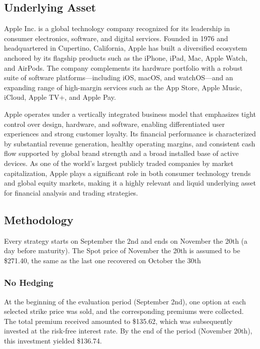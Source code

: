 \documentclass{article}
\begin{document}
\subsection{Underlying Asset}

Apple Inc. is a global technology company recognized for its leadership in consumer electronics, software, and digital services. Founded in 1976 and headquartered in Cupertino, California, Apple has built a diversified ecosystem anchored by its flagship products such as the iPhone, iPad, Mac, Apple Watch, and AirPods. The company complements its hardware portfolio with a robust suite of software platforms—including iOS, macOS, and watchOS—and an expanding range of high-margin services such as the App Store, Apple Music, iCloud, Apple TV+, and Apple Pay.

Apple operates under a vertically integrated business model that emphasizes tight control over design, hardware, and software, enabling differentiated user experiences and strong customer loyalty. Its financial performance is characterized by substantial revenue generation, healthy operating margins, and consistent cash flow supported by global brand strength and a broad installed base of active devices. As one of the world’s largest publicly traded companies by market capitalization, Apple plays a significant role in both consumer technology trends and global equity markets, making it a highly relevant and liquid underlying asset for financial analysis and trading strategies.

\subsection{Methodology}

Every strategy starts on September the 2nd and ends on November the 20th (a day before maturity). The Spot price of November the 20th is assumed to be \$271.40, the same as the last one recovered on October the 30th

\subsubsection{No Hedging}

At the beginning of the evaluation period (September 2nd), one option at each selected strike price was sold, and the corresponding premiums were collected. The total premium received amounted to \$135.62, which was subsequently invested at the risk-free interest rate. By the end of the period (November 20th), this investment yielded \$136.74.
\end{document}
